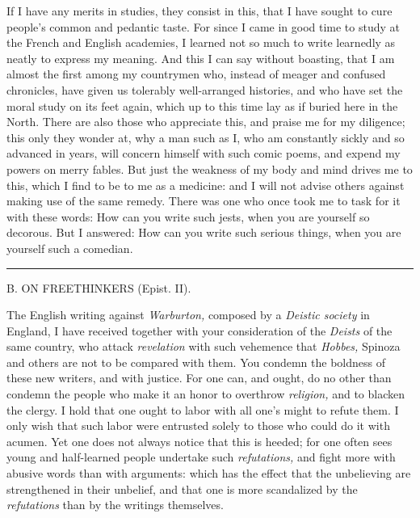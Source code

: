 \documentclass[12pt,a4paper,openany]{book}
\newcommand{\opage}[1]{\marginnote{\footnotesize\textit{[#1]}}}
\newcommand{\excerpthead}[1]{\par\bigskip\begin{center}#1\end{center}\nopagebreak\smallskip}
\newcommand{\sectionrule}{\par\begin{center}\rule{4em}{0.4pt}\end{center}}
\begin{document}
If I have any merits in studies, they consist in this, that I have sought to
cure people's common and
\setcounter{footnote}{0}%
\opage{10}pedantic taste.
For since I came in good time to study at the French and English academies, I
learned not so much to write learnedly as neatly to express my meaning. And this
I can say without boasting, that I am almost the first among my countrymen who,
instead of meager and confused chronicles, have given us tolerably well-arranged
histories, and who have set the moral study on its feet again, which up to this
time lay as if buried here in the North. There are also those who appreciate this,
and praise me for my diligence; this only they wonder at, why a man such as I,
who am constantly sickly and so advanced in years, will concern himself with
such comic poems, and expend my powers on merry fables. But just the weakness of
my body and mind drives me to this, which I find to be to me as a medicine: and
I will not advise others against making use of the same remedy. There was one
who once took me to task for it with these words: How can you write such jests,
when you are yourself so decorous. But I answered: How can you write such
serious things, when you are yourself such a comedian.


\sectionrule

\excerpthead{B. ON FREETHINKERS (Epist. II).}


The English writing against \textit{Warburton,} composed by a \textit{Deistic
society} in England, I have received together with your consideration of the
\textit{Deists} of the same country, who attack \textit{revelation} with such
vehemence that \textit{Hobbes,} Spinoza and others are not to be compared with
them. You condemn the boldness of these new writers, and with justice. For one
can, and ought, do no other than condemn the people who make it an honor to
overthrow \textit{religion,} and to blacken the clergy. I hold that one ought to
labor with all one's might to refute them. I only wish that such labor were
entrusted solely to those who could do it with
\setcounter{footnote}{0}%
\opage{11}acumen. Yet one does not always notice that this is heeded; for one often
sees young and half-learned people undertake such \textit{refutations,} and
fight more with abusive words than with arguments: which has the effect that the
unbelieving are strengthened in their unbelief, and that one is more scandalized
by the \textit{refutations} than by the writings themselves.
\end{document}
